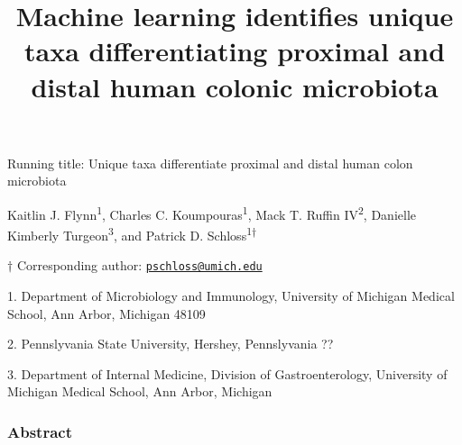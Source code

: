 \documentclass[11pt,]{article}
\title{\textbf{Machine learning identifies unique taxa differentiating proximal
and distal human colonic microbiota}}
\author{}
\date{}
\begin{document}
\maketitle


\vspace{35mm}

Running title: Unique taxa differentiate proximal and distal human colon
microbiota

\vspace{35mm}

Kaitlin J. Flynn\textsuperscript{1}, Charles C.
Koumpouras\textsuperscript{1}, Mack T. Ruffin IV\textsuperscript{2},
Danielle Kimberly Turgeon\textsuperscript{3}, and Patrick D.
Schloss\textsuperscript{1\(\dagger\)}

\vspace{35mm}

\(\dagger\) Corresponding author:
\href{mailto:pschloss@umich.edu}{\nolinkurl{pschloss@umich.edu}}

1. Department of Microbiology and Immunology, University of Michigan
Medical School, Ann Arbor, Michigan 48109

2. Pennslyvania State University, Hershey, Pennslyvania ??

3. Department of Internal Medicine, Division of Gastroenterology,
University of Michigan Medical School, Ann Arbor, Michigan

\newpage
\linenumbers

\subsubsection{Abstract}\label{abstract}
\end{document}
